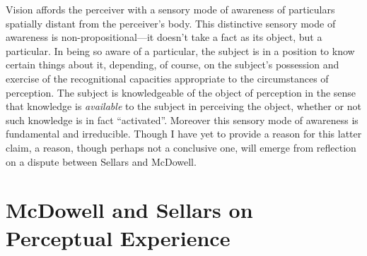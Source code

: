 \documentclass[12pt]{article}
\begin{document}
Vision affords the perceiver with a sensory mode of awareness of particulars spatially distant from the perceiver's body. This distinctive sensory mode of awareness is non-propositional---\-it doesn't take a fact as its object, but a particular. %
In being so aware of a particular, the subject is in a position to know certain things about it, depending, of course, on the subject's possession and exercise of the recognitional capacities appropriate to the circumstances of perception. The subject is knowledgeable of the object of perception in the sense that knowledge is \emph{available} to the subject in perceiving the object, whether or not such knowledge is in fact ``activated''. Moreover this sensory mode of awareness is fundamental and irreducible. Though I have yet to provide a reason for this latter claim, a reason, though perhaps not a conclusive one, will emerge from reflection on a dispute between Sellars and McDowell.


\section{McDowell and Sellars on Perceptual Experience} %
\label{sec:mcdowell_on_sellars_on_perception}
\end{document}
